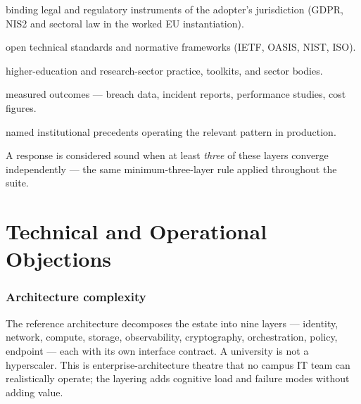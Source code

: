 \documentclass[11pt,a4paper,twoside]{book}
\newcommand{\institution}[1]{\textsc{#1}}
\newcommand{\evlegal}{\textcolor{BrickRed}{\textbf{[Legal]}}\space}
\newcommand{\evstd}{\textcolor{NavyBlue}{\textbf{[Standards]}}\space}
\newcommand{\evsector}{\textcolor{Plum}{\textbf{[Sector]}}\space}
\newcommand{\evempirical}{\textcolor{OliveGreen}{\textbf{[Empirical]}}\space}
\newcommand{\evinst}{\textcolor{Slate}{\textbf{[Institutional]}}\space}
\begin{document}
\begin{description}[leftmargin=2.2cm,style=nextline]
  \item[\evlegal] binding legal and regulatory instruments of the
        adopter's jurisdiction (\institution{GDPR},
        \institution{NIS2} and sectoral law in the worked EU
        instantiation).
  \item[\evstd] open technical standards and normative frameworks
        (\institution{IETF}, \institution{OASIS}, \institution{NIST},
        \institution{ISO}).
  \item[\evsector] higher-education and research-sector practice,
        toolkits, and sector bodies.
  \item[\evempirical] measured outcomes --- breach data, incident
        reports, performance studies, cost figures.
  \item[\evinst] named institutional precedents operating the relevant
        pattern in production.
\end{description}

A response is considered sound when at least \emph{three} of these layers
converge independently --- the same minimum-three-layer rule applied
throughout the suite.

\tableofcontents

\mainmatter

\part{Technical and Operational Objections}

\section{Architecture complexity}
\label{sec:arg-complexity}

\begin{questionbox}
The reference architecture decomposes the estate into nine layers ---
identity, network, compute, storage, observability, cryptography,
orchestration, policy, endpoint --- each with its own interface contract.
A university is not a hyperscaler. This is enterprise-architecture theatre
that no campus IT team can realistically operate; the layering adds
cognitive load and failure modes without adding value.
\end{questionbox}
\end{document}
